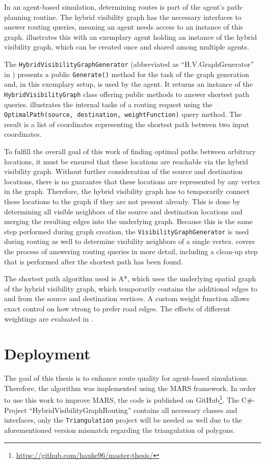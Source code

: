 	In an agent-based simulation, determining routes is part of the agent's path-planning routine.
	The hybrid visibility graph has the necessary interfaces to answer routing queries, meaning an agent needs access to an instance of this graph.
	 illustrates this with an exemplary agent holding an instance of the hybrid visibility graph, which can be created once and shared among multiple agents.
	
	The \texttt{HybridVisibilityGraphGenerator} (abbreviated as \enquote{H.V.GraphGenerator} in ) presents a public \texttt{Generate()} method for the task of the graph generation and, in this exemplary setup, is used by the agent.
	It returns an instance of the \texttt{HybridVisibilityGraph} class offering public methods to answer shortest path queries.
	 illustrates the internal tasks of a routing request using the \texttt{OptimalPath(source, destination, weightFunction)} query method.
	The result is a list of coordinates representing the shortest path between two input coordinates.
	
	To fulfill the overall goal of this work of finding optimal paths between arbitrary locations, it must be ensured that these locations are reachable via the hybrid visibility graph.
	Without further consideration of the source and destination locations, there is no guarantee that these locations are represented by any vertex in the graph.
	Therefore, the hybrid visibility graph has to temporarily connect these locations to the graph if they are not present already.
	This is done by determining all visible neighbors of the source and destination locations and merging the resulting edges into the underlying graph.
	Because this is the same step performed during graph creation, the \texttt{VisibilityGraphGenerator} is used during routing as well to determine visibility neighbors of a single vertex.
	 covers the process of answering routing queries in more detail, including a clean-up step that is performed after the shortest path has been found.
	
	The shortest path algorithm used is A*, which uses the underlying spatial graph of the hybrid visibility graph, which temporarily contains the additional edges to and from the source and destination vertices.
	A custom weight function allows exact control on how strong to prefer road edges.
	The effects of different weightings are evaluated in .

\section{Deployment}

	The goal of this thesis is to enhance route quality for agent-based simulations.
	Therefore, the algorithm was implemented using the MARS framework.
	In order to use this work to improve MARS, the code is published on GitHub\footnote{\url{https://github.com/hauke96/master-thesis/}}.
	The C\#-Project \enquote{HybridVisibilityGraphRouting} contains all necessary classes and interfaces, only the \texttt{Triangulation} project will be needed as well due to the aforementioned version mismatch regarding the triangulation of polygons.